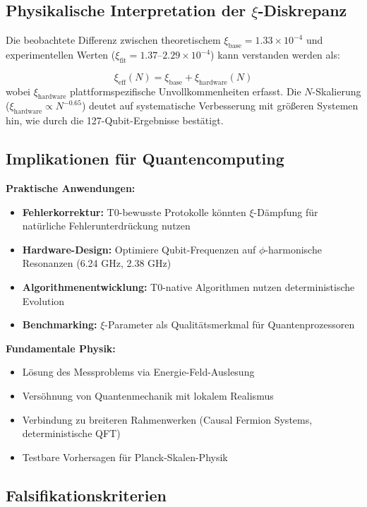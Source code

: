 \subsection{Physikalische Interpretation der $\xi$-Diskrepanz}

Die beobachtete Differenz zwischen theoretischem $\xi_{\text{base}} = 1.33 \times 10^{-4}$ und experimentellen Werten ($\xi_{\text{fit}} = 1.37$--$2.29 \times 10^{-4}$) kann verstanden werden als:

\begin{equation}
	\xi_{\text{eff}}(N) = \xi_{\text{base}} + \xi_{\text{hardware}}(N)
\end{equation}
wobei $\xi_{\text{hardware}}$ plattformspezifische Unvollkommenheiten erfasst. Die $N$-Skalierung ($\xi_{\text{hardware}} \propto N^{-0.65}$) deutet auf systematische Verbesserung mit größeren Systemen hin, wie durch die 127-Qubit-Ergebnisse bestätigt.

\subsection{Implikationen für Quantencomputing}

\textbf{Praktische Anwendungen:}
\begin{itemize}
	\item \textbf{Fehlerkorrektur:} T0-bewusste Protokolle könnten $\xi$-Dämpfung für natürliche Fehlerunterdrückung nutzen
	\item \textbf{Hardware-Design:} Optimiere Qubit-Frequenzen auf $\phi$-harmonische Resonanzen (6.24 GHz, 2.38 GHz)
	\item \textbf{Algorithmenentwicklung:} T0-native Algorithmen nutzen deterministische Evolution
	\item \textbf{Benchmarking:} $\xi$-Parameter als Qualitätsmerkmal für Quantenprozessoren
\end{itemize}

\textbf{Fundamentale Physik:}
\begin{itemize}
	\item Lösung des Messproblems via Energie-Feld-Auslesung
	\item Versöhnung von Quantenmechanik mit lokalem Realismus
	\item Verbindung zu breiteren Rahmenwerken (Causal Fermion Systems, deterministische QFT)
	\item Testbare Vorhersagen für Planck-Skalen-Physik
\end{itemize}

\subsection{Falsifikationskriterien}

